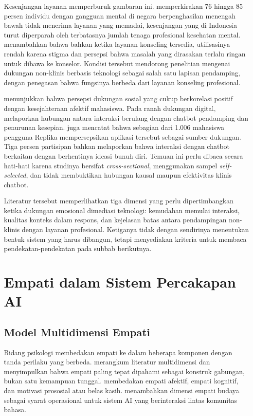 Kesenjangan layanan memperburuk gambaran ini. \textcite{who2022} memperkirakan 76 hingga 85 persen individu dengan gangguan mental di negara berpenghasilan menengah bawah tidak menerima layanan yang memadai, kesenjangan yang di Indonesia turut diperparah oleh terbatasnya jumlah tenaga profesional kesehatan mental. \textcite{eisenberg2021} menambahkan bahwa bahkan ketika layanan konseling tersedia, utilisasinya rendah karena stigma dan persepsi bahwa masalah yang dirasakan terlalu ringan untuk dibawa ke konselor. Kondisi tersebut mendorong penelitian mengenai dukungan non-klinis berbasis teknologi sebagai salah satu lapisan pendamping, dengan penegasan bahwa fungsinya berbeda dari layanan konseling profesional.

\textcite{pinho2020} menunjukkan bahwa persepsi dukungan sosial yang cukup berkorelasi positif dengan kesejahteraan afektif mahasiswa. Pada ranah dukungan digital, \textcite{defreitasLoneliness2024} melaporkan hubungan antara interaksi berulang dengan chatbot pendamping dan penurunan kesepian. \textcite{maples2024} juga mencatat bahwa sebagian dari 1.006 mahasiswa pengguna Replika mempersepsikan aplikasi tersebut sebagai sumber dukungan. Tiga persen partisipan bahkan melaporkan bahwa interaksi dengan chatbot berkaitan dengan berhentinya ideasi bunuh diri. Temuan ini perlu dibaca secara hati-hati karena studinya bersifat \textit{cross-sectional}, menggunakan sampel \textit{self-selected}, dan tidak membuktikan hubungan kausal maupun efektivitas klinis chatbot.

Literatur tersebut memperlihatkan tiga dimensi yang perlu dipertimbangkan ketika dukungan emosional dimediasi teknologi: kemudahan memulai interaksi, kualitas konteks dalam respons, dan kejelasan batas antara pendampingan non-klinis dengan layanan profesional. Ketiganya tidak dengan sendirinya menentukan bentuk sistem yang harus dibangun, tetapi menyediakan kriteria untuk membaca pendekatan-pendekatan pada subbab berikutnya.

\section{Empati dalam Sistem Percakapan AI}
\label{sec:empati}

\subsection{Model Multidimensi Empati}
\label{subsec:model-empati}

Bidang psikologi membedakan empati ke dalam beberapa komponen dengan tanda perilaku yang berbeda. \textcite{cuff2016} merangkum literatur multidimensi dan menyimpulkan bahwa empati paling tepat dipahami sebagai konstruk gabungan, bukan satu kemampuan tunggal. \textcite{decetyCowell2014} membedakan empati afektif, empati kognitif, dan motivasi prososial atau belas kasih. \textcite{pendse2022} menambahkan dimensi empati budaya sebagai syarat operasional untuk sistem AI yang berinteraksi lintas komunitas bahasa.

